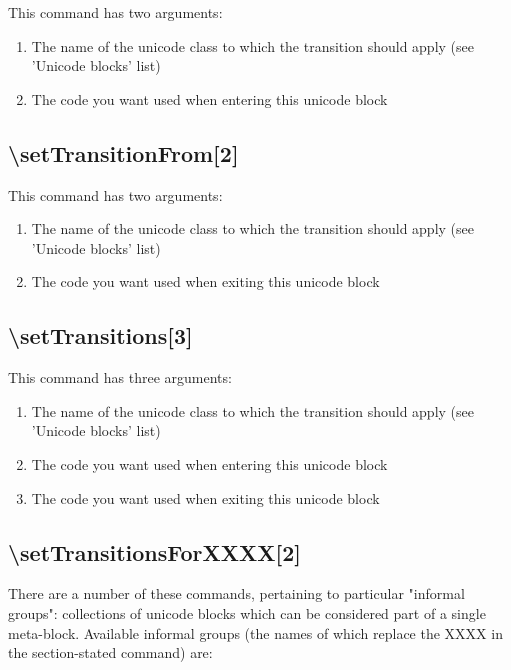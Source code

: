 ﻿\documentclass{article}
\newenvironment{numberlist}{%
  \begin{enumerate}
	\setlength{\itemsep}{0pt}
	\setlength{\parsep}{0pt}
	\setlength{\topsep}{0pt}
	\setlength{\partopsep}{0pt}
	\setlength{\parskip}{0pt}
	\setlength{\labelsep}{5pt}}%
{
  \end{enumerate}}
\begin{document}
			This command has two arguments:
			
			\begin{numberlist}
				\item The name of the unicode class to which the transition should apply (see 'Unicode blocks' list)
				\item The code you want used when entering this unicode block
			\end{numberlist}

		\subsection{\textbackslash setTransitionFrom[2]}

			This command has two arguments:
			
			\begin{numberlist}
				\item The name of the unicode class to which the transition should apply (see 'Unicode blocks' list)
				\item The code you want used when exiting this unicode block
			\end{numberlist}
		
		\subsection{\textbackslash setTransitions[3]}
		
			This command has three arguments:	
		
			\begin{numberlist}
				\item The name of the unicode class to which the transition should apply (see 'Unicode blocks' list)
				\item The code you want used when entering this unicode block
				\item The code you want used when exiting this unicode block
			\end{numberlist}

		\subsection{\textbackslash setTransitionsForXXXX[2]}

			There are a number of these commands, pertaining to particular "informal groups": collections of unicode blocks which can be considered part of a single meta-block. Available informal groups (the names of which replace the XXXX in the section-stated command) are:
			
\end{document}
